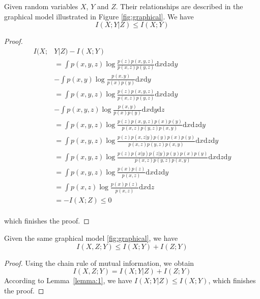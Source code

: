 \begin{lemma}
    \label{lemma:1}
    Given random variables $X$, $Y$ and $Z$. Their relationships are described in the graphical model illustrated in Figure \ref{fig:graphical}. We have
\begin{equation}
    I(X; Y | Z) \leq I(X; Y)
\end{equation}
\end{lemma}
\begin{proof}

\begin{equation}
    \begin{aligned}
I(X; &Y | Z) - I(X; Y) \\
&= \int p(x, y, z) \log \frac{p(z)p(x, y, z)}{p(x, z)p(y, z)} \mathrm{d}x \mathrm{d}z \mathrm{d}y \\ &- \int p(x, y) \log \frac{p(x, y)}{p(x)p(y)} \mathrm{d}x \mathrm{d}y\\
&=\int p(x, y, z) \log \frac{p(z)p(x, y, z)}{p(x, z)p(y, z)} \mathrm{d}x \mathrm{d}z \mathrm{d}y \\ &- \int p(x, y, z) \log \frac{p(x, y)}{p(x)p(y)} \mathrm{d}x \mathrm{d}y \mathrm{d}z\\
&=\int p(x, y, z) \log \frac{p(z)p(x,y,z)p(x)p(y)}{p(x,z)p(y,z)p(x,y)}\mathrm{d}x \mathrm{d}z \mathrm{d}y\\
&=\int p(x, y, z) \log \frac{p(z)p(x,z|y)p(y)p(x)p(y)}{p(x,z)p(y,z)p(x,y)}\mathrm{d}x \mathrm{d}z \mathrm{d}y\\
&=\int p(x, y, z) \log \frac{p(z)p(x|y)p(z|y)p(y)p(x)p(y)}{p(x,z)p(y,z)p(x,y)}\mathrm{d}x \mathrm{d}z \mathrm{d}y\\
&=\int p(x, y, z) \log \frac{p(x)p(z)}{p(x,z)}\mathrm{d}x \mathrm{d}z \mathrm{d}y\\
&=\int p(x, z) \log \frac{p(x)p(z)}{p(x,z)}\mathrm{d}x \mathrm{d}z\\
&=-I(X; Z) \leq 0
    \end{aligned}
\end{equation}
\\which finishes the proof.

\end{proof}
\begin{corollary}
\label{cor:ib}
    Given the same graphical model \ref{fig:graphical}, we have
    \begin{equation}
        I(X, Z; Y) \leq I(X; Y) + I(Z; Y)    
    \end{equation}

\end{corollary}
\begin{proof}
Using the chain rule of mutual information, we obtain
\begin{equation}
    I(X,Z;Y) = I(X;Y|Z) + I(Z; Y)
\end{equation}
According to Lemma~\ref{lemma:1}, we have $I(X; Y|Z) \leq I(X; Y)$, which finishes the proof.

\end{proof}

